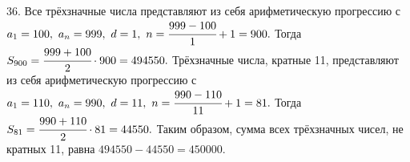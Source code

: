 36. Все трёхзначные числа представляют из себя арифметическую прогрессию с $a_1=100,\ a_n=999,\ d=1,\ n=\cfrac{999-100}{1}+1=900.$ Тогда $S_{900}=\cfrac{999+100}{2}\cdot900=494550.$ Трёхзначные числа, кратные 11, представляют из себя арифметическую прогрессию с $a_1=110,\ a_n=990,\ d=11,\ n=\cfrac{990-110}{11}+1=81.$ Тогда $S_{81}=\cfrac{990+110}{2}\cdot81=44550.$ Таким образом, сумма всех трёхзначных чисел, не кратных 11, равна $494550-44550=450000.$\\
